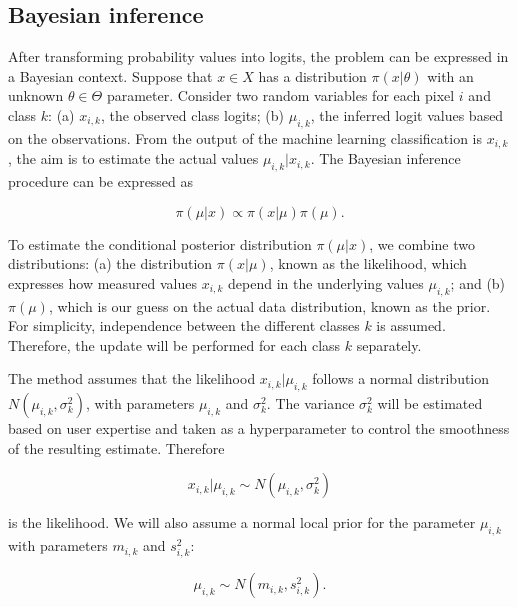\documentclass[
  shortnames]{jss}
\begin{document}
\hypertarget{bayesian-inference}{%
\subsection{Bayesian inference}\label{bayesian-inference}}

After transforming probability values into logits, the problem can be expressed in a Bayesian context. Suppose that \(x\in{}X\) has a distribution \(\pi(x|\theta)\) with an unknown \(\theta{}\in{}\Theta{}\) parameter. Consider two random variables for each pixel \(i\) and class \(k\): (a) \(x_{i,k}\), the observed class logits; (b) \(\mu_{i,k}\), the inferred logit values based on the observations. From the output of the machine learning classification is \(x_{i,k}\), the aim is to estimate the actual values \(\mu_{i,k} | x_{i,k}\). The Bayesian inference procedure can be expressed as

\begin{equation}
\pi(\mu|x) \propto{} \pi(x|\mu)\pi(\mu).
\end{equation}

To estimate the conditional posterior distribution \(\pi(\mu|x)\), we combine two distributions: (a) the distribution \(\pi(x|\mu)\), known as the likelihood, which expresses how measured values \(x_{i,k}\) depend in the underlying values \(\mu_{i,k}\); and (b) \(\pi(\mu)\), which is our guess on the actual data distribution, known as the prior. For simplicity, independence between the different classes \(k\) is assumed. Therefore, the update will be performed for each class \(k\) separately.

The method assumes that the likelihood \(x_{i,k} | \mu_{i,k}\) follows a normal distribution \(N(\mu_{i,k}, \sigma^2_{k})\), with parameters \(\mu_{i,k}\) and \(\sigma^2_{k}\). The variance \(\sigma^2_{k}\) will be estimated based on user expertise and taken as a hyperparameter to control the smoothness of the resulting estimate. Therefore

\begin{equation}
x_{i,k} | \mu_{i,k} \sim N(\mu_{i,k}, \sigma^2_{k})
\end{equation}

is the likelihood. We will also assume a normal local prior for the parameter \(\mu_{i,k}\) with parameters \(m_{i,k}\) and \(s^2_{i,k}\):

\begin{equation}
    \mu_{i,k} \sim N(m_{i,k}, s^2_{i,k}).
\end{equation}
\end{document}
